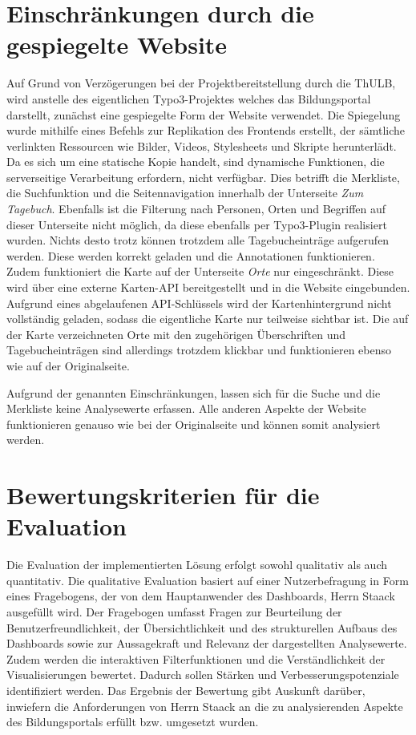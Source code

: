 \section{Einschränkungen durch die gespiegelte Website}
\label{sec:einschränkungen }
Auf Grund von Verzögerungen bei der Projektbereitstellung durch die ThULB, wird anstelle des eigentlichen Typo3-Projektes welches das Bildungsportal darstellt, zunächst eine gespiegelte Form der Website verwendet. Die Spiegelung wurde mithilfe eines Befehls zur Replikation des Frontends erstellt, der sämtliche verlinkten Ressourcen wie Bilder, Videos, Stylesheets und Skripte herunterlädt. Da es sich um eine statische Kopie handelt, sind dynamische Funktionen, die serverseitige Verarbeitung erfordern, nicht verfügbar. Dies betrifft die Merkliste, die Suchfunktion und die Seitennavigation innerhalb der Unterseite \textit{Zum Tagebuch}. Ebenfalls ist die Filterung nach Personen, Orten und Begriffen auf dieser Unterseite nicht möglich, da diese ebenfalls per Typo3-Plugin realisiert wurden. Nichts desto trotz können trotzdem alle Tagebucheinträge aufgerufen werden. Diese werden korrekt geladen und die Annotationen funktionieren. Zudem funktioniert die Karte auf der Unterseite \textit{Orte} nur eingeschränkt. Diese wird über eine externe Karten-API bereitgestellt und in die Website eingebunden. Aufgrund eines abgelaufenen API-Schlüssels wird der Kartenhintergrund nicht vollständig geladen, sodass die eigentliche Karte nur teilweise sichtbar ist. Die auf der Karte verzeichneten Orte mit den zugehörigen Überschriften und Tagebucheinträgen sind allerdings trotzdem klickbar und funktionieren ebenso wie auf der Originalseite. 

Aufgrund der genannten Einschränkungen, lassen sich für die Suche und die Merkliste keine Analysewerte erfassen. Alle anderen Aspekte der Website funktionieren genauso wie bei der Originalseite und können somit analysiert werden.

\section{Bewertungskriterien für die Evaluation}
\label{sec:bewertungskriterien}
Die Evaluation der implementierten Lösung erfolgt sowohl qualitativ als auch quantitativ. Die qualitative Evaluation basiert auf einer Nutzerbefragung in Form eines Fragebogens, der von dem Hauptanwender des Dashboards, Herrn Staack ausgefüllt wird. Der Fragebogen umfasst Fragen zur Beurteilung der Benutzerfreundlichkeit, der Übersichtlichkeit und des strukturellen Aufbaus des Dashboards sowie zur Aussagekraft und Relevanz der dargestellten Analysewerte. Zudem werden die interaktiven Filterfunktionen und die Verständlichkeit der Visualisierungen bewertet. Dadurch sollen Stärken und Verbesserungspotenziale identifiziert werden. Das Ergebnis der Bewertung gibt Auskunft darüber, inwiefern die Anforderungen von Herrn Staack an die zu analysierenden Aspekte des Bildungsportals erfüllt bzw. umgesetzt wurden.

